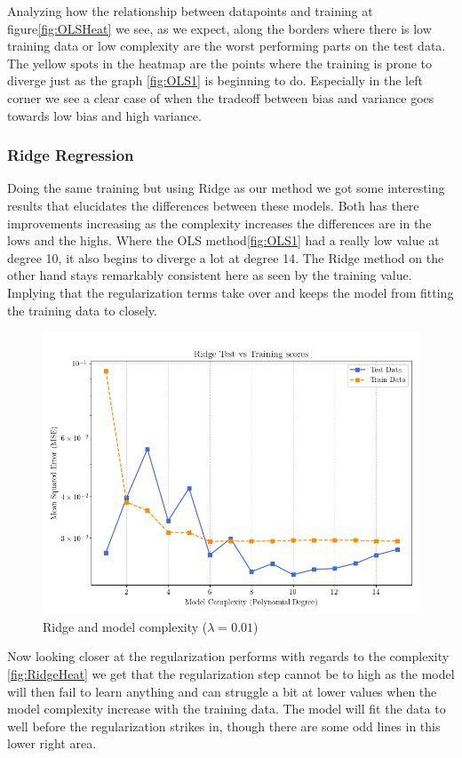 \documentclass[twocolumn,aps]{revtex4}
\begin{document}
Analyzing how the relationship between datapoints and training at figure\ref{fig:OLSHeat} we see, as we expect, along the borders where there is low training data or low complexity are the worst performing parts on the test data. 
The yellow spots in the heatmap are the points where the training is prone to diverge just as the graph \ref{fig:OLS1} is beginning to do.
Especially in the left corner we see a clear case of when the tradeoff between bias and variance goes towards low bias and high variance.


\subsubsection{Ridge Regression}
Doing the same training but using Ridge as our method we got some interesting results that elucidates the differences between these models.
Both has there improvements increasing as the complexity increases the differences are in the lows and the highs.
Where the OLS method\ref{fig:OLS1} had a really low value at degree 10, it also begins to diverge a lot at degree 14.
The Ridge method on the other hand stays remarkably consistent here as seen by the training value. 
Implying that the regularization terms take over and keeps the model from fitting the training data to closely. 

\begin{figure}[h]
    \centering
    \includegraphics[width=.95 \linewidth]{Figures/MSE_RidgeOnly.png}
    \caption{Ridge and model complexity ($\lambda=0.01$)}
    \label{fig:RidgeMse}
\end{figure}

Now looking closer at the regularization performs with regards to the complexity \ref{fig:RidgeHeat} we get that the regularization step cannot be to high as the model will then fail to learn anything and can struggle a bit at lower values when the model complexity increase with the training data.
The model will fit the data to well before the regularization strikes in, though there are some odd lines in this lower right area.
\end{document}
